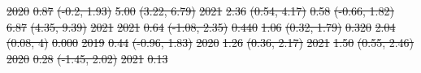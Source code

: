 \documentclass[
  letterpaper,
  DIV=11,
  numbers=noendperiod]{scrartcl}
\providecommand{\DIFdeltex}[1]{{\protect\color{red}\sout{#1}}}                      %
\providecommand{\DIFdelFL}[1]{\DIFdel{#1}} %
\providecommand{\DIFdel}[1]{\texorpdfstring{\DIFdeltex{#1}}{}} %
\begin{document}
\DIFdelFL{2020 }%
\DIFdelFL{0.87 }%
\DIFdelFL{(-0.2, 1.93) }%
\DIFdelFL{5.00 }%
\DIFdelFL{(3.22, 6.79) }%
\DIFdelFL{2021 }%
\DIFdelFL{2.36 }%
\DIFdelFL{(0.54, 4.17) }%
\DIFdelFL{0.58 }%
\DIFdelFL{(-0.66, 1.82) }%
\DIFdelFL{6.87 }%
\DIFdelFL{(4.35, 9.39) }%
\DIFdelFL{\hspace{1em}2021 }%
\DIFdelFL{2021 }%
\DIFdelFL{0.64 }%
\DIFdelFL{(-1.08, 2.35) }%
\DIFdelFL{0.440 }%
\DIFdelFL{1.06 }%
\DIFdelFL{(0.32, 1.79) }%
\DIFdelFL{0.320 }%
\DIFdelFL{2.04 }%
\DIFdelFL{(0.08, 4) }%
\DIFdelFL{0.000}%
\DIFdelFL{2019 }%
\DIFdelFL{0.44 }%
\DIFdelFL{(-0.96, 1.83) }%
\DIFdelFL{2020 }%
\DIFdelFL{1.26 }%
\DIFdelFL{(0.36, 2.17) }%
\DIFdelFL{2021 }%
\DIFdelFL{1.50 }%
\DIFdelFL{(0.55, 2.46) }%
\DIFdelFL{2020 }%
\DIFdelFL{0.28 }%
\DIFdelFL{(-1.45, 2.02) }%
\DIFdelFL{2021 }%
\DIFdelFL{0.13 }%
\end{document}
